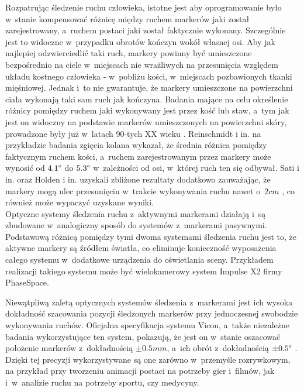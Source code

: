 Rozpatrując śledzenie ruchu człowieka, istotne jest aby oprogramowanie było w~stanie kompensować różnicę między ruchem markerów jaki został zarejestrowany, a~ruchem postaci jaki został faktycznie wykonany. Szczególnie jest to widoczne w~przypadku obrotów kończyn wokół własnej osi. Aby jak najlepiej odzwierciedlić taki ruch, markery powinny być umieszczone bezpośrednio na ciele w~miejscach nie wrażliwych na przesunięcia względem układu kostnego człowieka - w~pobliżu kości, w~miejscach pozbawionych tkanki mięśniowej. Jednak i~to nie gwarantuje, że markery umieszczone na powierzchni ciała wykonają taki sam ruch jak kończyna. Badania mające na celu określenie różnicy pomiędzy ruchem jaki wykonywany jest przez kość lub staw, a~tym jak jest on widoczny na podstawie markerów umieszczonych na powierzchni skóry, prowadzone były już w~latach 90-tych XX wieku \cite{Sati2016,Reinschmidt2016,Holden2016}. Reinschmidt i in. \cite{Reinschmidt2016} na przykładzie badania zgięcia kolana wykazał, że średnia różnica pomiędzy faktycznym ruchem kości, a~ruchem zarejestrowanym przez markery może wynosić od $4.1\degree$ do $5.3\degree$ w~zależności od osi, w~której ruch ten się odbywał. Sati i in. \cite{Sati2016} oraz Holden i in. \cite{Holden2016} uzyskali zbliżone rezultaty dodatkowo zauważając, że markery mogą ulec przesunięciu w~trakcie wykonywania ruchu nawet o~$2cm$ \cite{Sati2016}, co również może wypaczyć uzyskane wyniki.\\ 
			
Optyczne systemy śledzenia ruchu z~aktywnymi markerami działają i~są zbudowane w~analogiczny sposób do systemów z~markerami pasywnymi. Podstawową różnicą pomiędzy tymi dwoma systemami śledzenia ruchu jest to, że aktywne markery są źródłem światła, co eliminuje konieczność wyposażenia całego systemu w~dodatkowe urządzenia do oświetlania sceny. Przykładem realizacji takiego systemu może być wielokamerowy system Impulse X2 firmy PhaseSpace{}.
			
Niewątpliwą zaletą optycznych systemów śledzenia z~markerami jest ich wysoka dokładność szacowania pozycji śledzonych markerów przy jednoczesnej swobodzie wykonywania ruchów. Oficjalna specyfikacja systemu Vicon, a~także niezależne badania wykorzystujące ten system, pokazują, że jest on w~stanie oszacować położenie markerów z~dokładnością $\pm0.5mm$, a~ich obrót z~dokładnością $\pm0.5 \degree$ \cite{Windolf2008}. Dzięki tej precyzji wykorzystywane są one zarówno w~przemyśle rozrywkowym, na przykład przy tworzeniu animacji postaci na potrzeby gier i~filmów, jak i~w~analizie ruchu na potrzeby sportu, czy medycyny{}. 
			
